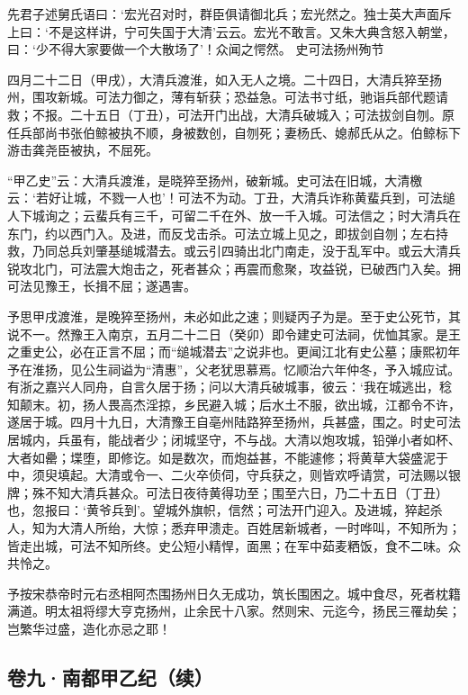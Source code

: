 \documentclass[]{article}
\begin{document}
先君子述舅氏语曰：`宏光召对时，群臣俱请御北兵；宏光然之。独士英大声面斥上曰：`不是这样讲，宁可失国于大清'云云。宏光不敢言。又朱大典含怒入朝堂，曰：`少不得大家要做一个大散场了'！众闻之愕然。
史可法扬州殉节

四月二十二日（甲戌），大清兵渡淮，如入无人之境。二十四日，大清兵猝至扬州，围攻新城。可法力御之，薄有斩获；恐益急。可法书寸纸，驰诣兵部代题请救；不报。二十五日（丁丑），可法开门出战，大清兵破城入；可法拔剑自刎。原任兵部尚书张伯鲸被执不顺，身被数创，自刎死；妻杨氏、媳郝氏从之。伯鲸标下游击龚尧臣被执，不屈死。

``甲乙史''云：大清兵渡淮，是晓猝至扬州，破新城。史可法在旧城，大清檄云：`若好让城，不戮一人也'！可法不为动。丁丑，大清兵诈称黄蜚兵到，可法缒人下城询之；云蜚兵有三千，可留二千在外、放一千入城。可法信之；时大清兵在东门，约以西门入。及进，而反戈击杀。可法立城上见之，即拔剑自刎；左右持救，乃同总兵刘肇基缒城潜去。或云引四骑出北门南走，没于乱军中。或云大清兵锐攻北门，可法震大炮击之，死者甚众；再震而愈聚，攻益锐，已破西门入矣。拥可法见豫王，长揖不屈；遂遇害。

予思甲戌渡淮，是晚猝至扬州，未必如此之速；则疑丙子为是。至于史公死节，其说不一。然豫王入南京，五月二十二日（癸卯）即令建史可法祠，优恤其家。是王之重史公，必在正言不屈；而``缒城潜去''之说非也。更闻江北有史公墓；康熙初年予在淮扬，见公生祠谥为``清惠''，父老犹思慕焉。忆顺治六年仲冬，予入城应试。有浙之嘉兴人同舟，自言久居于扬；问以大清兵破城事，彼云：`我在城逃出，稔知颠末。初，扬人畏高杰淫掠，乡民避入城；后水土不服，欲出城，江都令不许，遂居于城。四月十九日，大清豫王自亳州陆路猝至扬州，兵甚盛，围之。时史可法居城内，兵虽有，能战者少；闭城坚守，不与战。大清以炮攻城，铅弹小者如杯、大者如罍；堞堕，即修讫。如是数次，而炮益甚，不能遽修；将黄草大袋盛泥于中，须臾填起。大清或令一、二火卒侦伺，守兵获之，则皆欢呼请赏，可法赐以银牌；殊不知大清兵甚众。可法日夜待黄得功至；围至六日，乃二十五日（丁丑）也，忽报曰：`黄爷兵到'。望城外旗帜，信然；可法开门迎入。及进城，猝起杀人，知为大清人所绐，大惊；悉弃甲溃走。百姓居新城者，一时哗叫，不知所为；皆走出城，可法不知所终。史公短小精悍，面黑；在军中茹麦粞饭，食不二味。众共怜之。

予按宋恭帝时元右丞相阿杰围扬州日久无成功，筑长围困之。城中食尽，死者枕籍满道。明太祖将缪大亨克扬州，止余民十八家。然则宋、元迄今，扬民三罹劫矣；岂繁华过盛，造化亦忌之耶！

\hypertarget{header-n57}{%
\subsection{卷九·南都甲乙纪（续）}\label{header-n57}}
\end{document}
